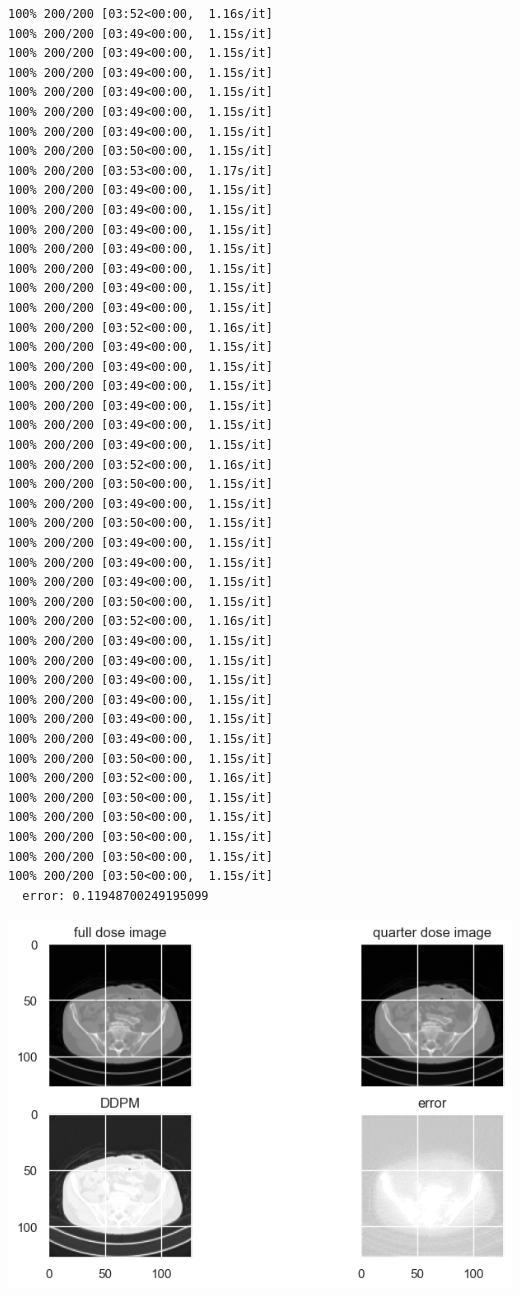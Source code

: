 \documentclass[a4paper, 11pt]{article}
\begin{document}
\begin{verbatim}
100% 200/200 [03:52<00:00,  1.16s/it]
100% 200/200 [03:49<00:00,  1.15s/it]
100% 200/200 [03:49<00:00,  1.15s/it]
100% 200/200 [03:49<00:00,  1.15s/it]
100% 200/200 [03:49<00:00,  1.15s/it]
100% 200/200 [03:49<00:00,  1.15s/it]
100% 200/200 [03:49<00:00,  1.15s/it]
100% 200/200 [03:50<00:00,  1.15s/it]
100% 200/200 [03:53<00:00,  1.17s/it]
100% 200/200 [03:49<00:00,  1.15s/it]
100% 200/200 [03:49<00:00,  1.15s/it]
100% 200/200 [03:49<00:00,  1.15s/it]
100% 200/200 [03:49<00:00,  1.15s/it]
100% 200/200 [03:49<00:00,  1.15s/it]
100% 200/200 [03:49<00:00,  1.15s/it]
100% 200/200 [03:49<00:00,  1.15s/it]
100% 200/200 [03:52<00:00,  1.16s/it]
100% 200/200 [03:49<00:00,  1.15s/it]
100% 200/200 [03:49<00:00,  1.15s/it]
100% 200/200 [03:49<00:00,  1.15s/it]
100% 200/200 [03:49<00:00,  1.15s/it]
100% 200/200 [03:49<00:00,  1.15s/it]
100% 200/200 [03:49<00:00,  1.15s/it]
100% 200/200 [03:52<00:00,  1.16s/it]
100% 200/200 [03:50<00:00,  1.15s/it]
100% 200/200 [03:49<00:00,  1.15s/it]
100% 200/200 [03:50<00:00,  1.15s/it]
100% 200/200 [03:49<00:00,  1.15s/it]
100% 200/200 [03:49<00:00,  1.15s/it]
100% 200/200 [03:49<00:00,  1.15s/it]
100% 200/200 [03:50<00:00,  1.15s/it]
100% 200/200 [03:52<00:00,  1.16s/it]
100% 200/200 [03:49<00:00,  1.15s/it]
100% 200/200 [03:49<00:00,  1.15s/it]
100% 200/200 [03:49<00:00,  1.15s/it]
100% 200/200 [03:49<00:00,  1.15s/it]
100% 200/200 [03:49<00:00,  1.15s/it]
100% 200/200 [03:49<00:00,  1.15s/it]
100% 200/200 [03:50<00:00,  1.15s/it]
100% 200/200 [03:52<00:00,  1.16s/it]
100% 200/200 [03:50<00:00,  1.15s/it]
100% 200/200 [03:50<00:00,  1.15s/it]
100% 200/200 [03:50<00:00,  1.15s/it]
100% 200/200 [03:50<00:00,  1.15s/it]
100% 200/200 [03:50<00:00,  1.15s/it]
  error: 0.11948700249195099
\end{verbatim}
\begin{center}
\includegraphics[width=.9\linewidth]{./.ob-jupyter/da8b230284e5503497e7e30a76f4e73bb3cc5842.png}
\end{center}
\end{document}

